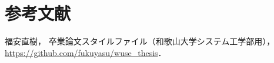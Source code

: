 \documentclass[11pt]{jreport}
\begin{document}
\chapter{参考文献}





\begin{thebibliography}{99}

  福安直樹，
  卒業論文スタイルファイル（和歌山大学システム工学部用），\\
  \url{https://github.com/fukuyasu/wuse_thesis}．


\end{thebibliography}


% 
% 
% 

\end{document}
